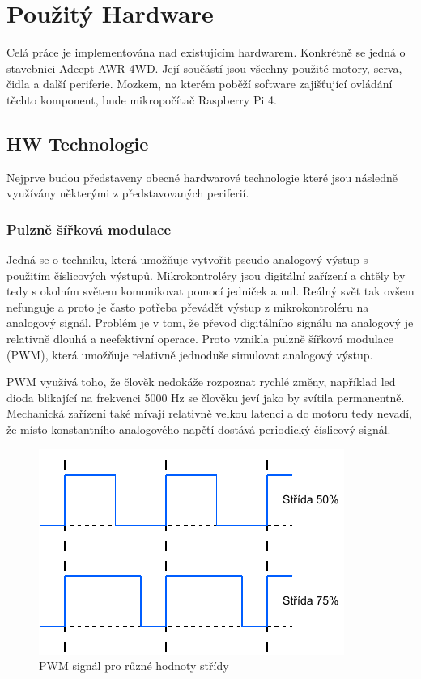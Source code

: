 \chapter{Použitý Hardware}
Celá práce je implementována nad existujícím hardwarem. Konkrétně se jedná o stavebnici Adeept AWR 4WD. Její součástí jsou všechny použité motory, serva, čidla a další periferie. Mozkem, na kterém poběží software zajišťující ovládání těchto komponent, bude mikropočítač Raspberry Pi 4.

\section{HW Technologie}
Nejprve budou představeny obecné hardwarové technologie které jsou následně využívány některými z představovaných periferií.

\subsection*{Pulzně šířková modulace}
Jedná se o techniku, která umožňuje vytvořit pseudo-analogový výstup s použitím číslicových výstupů. Mikrokontroléry jsou digitální zařízení a chtěly by tedy s okolním světem komunikovat pomocí jedniček a nul. Reálný svět tak ovšem nefunguje a proto je často potřeba převádět výstup z mikrokontroléru na analogový signál. Problém je v tom, že převod digitálního signálu na analogový je relativně dlouhá a neefektivní operace. Proto vznikla pulzně šířková modulace (PWM), která umožňuje relativně jednoduše simulovat analogový výstup. \cite{embeded_robotics}

PWM využívá toho, že člověk nedokáže rozpoznat rychlé změny, například led dioda blikající na frekvenci 5000 Hz se člověku jeví jako by svítila permanentně. Mechanická zařízení také mívají relativně velkou latenci a dc motoru tedy nevadí, že místo konstantního analogového napětí dostává periodický číslicový signál. \cite{embeded_robotics}

\begin{figure}[h!]
	\centering
	\includegraphics[scale=1]{obrazky-figures/pwm_duty_cycle.pdf}
	\caption{PWM signál pro různé hodnoty střídy}
	\label{}
\end{figure}

